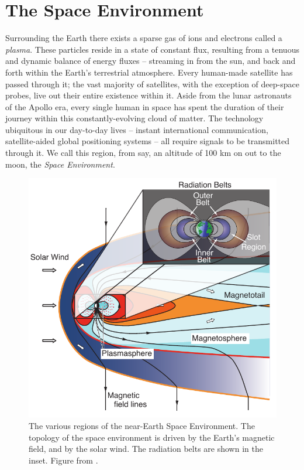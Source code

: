 \section{The Space Environment}
Surrounding the Earth there exists a sparse gas of ions and electrons called a \emph{plasma}. These particles reside in a state of constant flux, resulting from a tenuous and dynamic balance of energy fluxes -- streaming in from the sun, and back and forth within the Earth's terrestrial atmosphere. Every human-made satellite has passed through it; the vast majority of satellites, with the exception of deep-space probes, live out their entire existence within it. Aside from the lunar astronauts of the Apollo era, every single human in space has spent the duration of their journey within this constantly-evolving cloud of matter. The technology ubiquitous in our day-to-day lives -- instant international communication, satellite-aided global positioning systems -- all require signals to be transmitted through it. We call this region, from say, an altitude of 100 km on out to the moon, the \emph{Space Environment}.


\begin{figure}[t]
\begin{center}
\includegraphics{figures/space_environment_figure.pdf}
\caption[Diagram of the various regions of the space environment]{The various regions of the near-Earth Space Environment. The topology of the space environment is driven by the Earth's magnetic field, and by the solar wind. The radiation belts are shown in the inset. Figure from \cite{Graf2013}.}
\label{fig:space_environment}
\end{center}
\end{figure}

